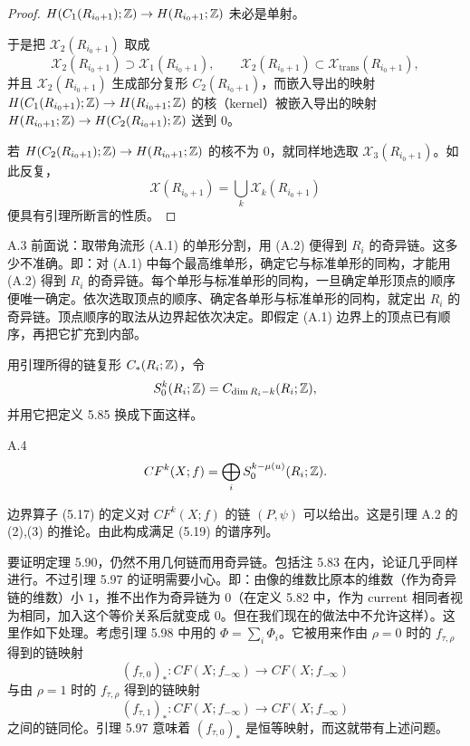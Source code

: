 \begin{proof}
  $H(C_1(R_{i_0+1});\mathbb{Z})\to H(R_{i_0+1};\mathbb{Z})$ 未必是单射。

  于是把 $\mathcal{X}_2(R_{i_0+1})$ 取成
  \[
    \mathcal{X}_2(R_{i_0+1})\supset\mathcal{X}_1(R_{i_0+1}),\qquad
    \mathcal{X}_2(R_{i_0+1})\subset\mathcal{X}_{\mathrm{trans}}(R_{i_0+1}),
  \]
  并且 $\mathcal{X}_2(R_{i_0+1})$ 生成部分复形 $C_2(R_{i_0+1})$，而嵌入导出的映射 $H(C_1(R_{i_0+1});\mathbb{Z})\to H(R_{i_0+1};\mathbb{Z})$ 的核（kernel）被嵌入导出的映射 $H(R_{i_0+1};\mathbb{Z})\to H(C_2(R_{i_0+1});\mathbb{Z})$ 送到 $0$。

  若 $H(C_2(R_{i_0+1});\mathbb{Z})\to H(R_{i_0+1};\mathbb{Z})$ 的核不为 $0$，就同样地选取 $\mathcal{X}_3(R_{i_0+1})$。如此反复，
  \[
    \mathcal{X}(R_{i_0+1})=\bigcup_k\mathcal{X}_k(R_{i_0+1})
  \]
  便具有引理所断言的性质。
\end{proof}

\begin{remark}{A.3}
  前面说：取带角流形 (A.1) 的单形分割，用 (A.2) 便得到 $R_i$ 的奇异链。这多少不准确。即：对 (A.1) 中每个最高维单形，确定它与标准单形的同构，才能用 (A.2) 得到 $R_i$ 的奇异链。每个单形与标准单形的同构，一旦确定单形顶点的顺序便唯一确定。依次选取顶点的顺序、确定各单形与标准单形的同构，就定出 $R_i$ 的奇异链。顶点顺序的取法从边界起依次决定。即假定 (A.1) 边界上的顶点已有顺序，再把它扩充到内部。
\end{remark}

用引理所得的链复形 $C_*(R_i;\mathbb{Z})$，令
\[
  S_0^k(R_i;\mathbb{Z})=C_{\dim R_i-k}(R_i;\mathbb{Z}),
\]
并用它把定义 5.85 换成下面这样。

\begin{definition}{A.4}
  \[
    CF^k(X;f)=\bigoplus_i S_0^{k-\mu(u)}(R_i;\mathbb{Z}).
  \]
\end{definition}

边界算子 (5.17) 的定义对 $CF^k(X;f)$ 的链 $(P,\psi)$ 可以给出。这是引理 A.2 的 (2),(3) 的推论。由此构成满足 (5.19) 的谱序列。

要证明定理 5.90，仍然不用几何链而用奇异链。包括注 5.83 在内，论证几乎同样进行。不过引理 5.97 的证明需要小心。即：由像的维数比原本的维数（作为奇异链的维数）小 $1$，推不出作为奇异链为 $0$（在定义 5.82 中，作为 current 相同者视为相同，加入这个等价关系后就变成 $0$。但在我们现在的做法中不允许这样）。这里作如下处理。考虑引理 5.98 中用的 $\Phi=\sum_i\Phi_i$。它被用来作由 $\rho=0$ 时的 $f_{\tau,\rho}$ 得到的链映射
\begin{equation}
  (f_{\tau,0})_*\colon CF(X;f_{-\infty})\to CF(X;f_{-\infty}) \tag{A.4}
\end{equation}
与由 $\rho=1$ 时的 $f_{\tau,\rho}$ 得到的链映射
\begin{equation}
  (f_{\tau,1})_*\colon CF(X;f_{-\infty})\to CF(X;f_{-\infty}) \tag{A.5}
\end{equation}
之间的链同伦。引理 5.97 意味着 $(f_{\tau,0})_*$ 是恒等映射，而这就带有上述问题。

